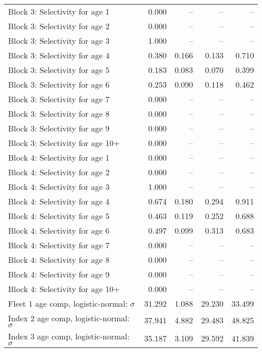 \documentclass[
]{article}
\begin{document}
\begin{landscape}
\begin{longtable}[t]{lrrrr}
Block 3: Selectivity for age 1 & 0.000 & -- & -- & --\\
Block 3: Selectivity for age 2 & 0.000 & -- & -- & --\\
Block 3: Selectivity for age 3 & 1.000 & -- & -- & --\\
Block 3: Selectivity for age 4 & 0.380 & 0.166 & 0.133 & 0.710\\
\addlinespace
Block 3: Selectivity for age 5 & 0.183 & 0.083 & 0.070 & 0.399\\
Block 3: Selectivity for age 6 & 0.253 & 0.090 & 0.118 & 0.462\\
Block 3: Selectivity for age 7 & 0.000 & -- & -- & --\\
Block 3: Selectivity for age 8 & 0.000 & -- & -- & --\\
Block 3: Selectivity for age 9 & 0.000 & -- & -- & --\\
\addlinespace
Block 3: Selectivity for age 10+ & 0.000 & -- & -- & --\\
Block 4: Selectivity for age 1 & 0.000 & -- & -- & --\\
Block 4: Selectivity for age 2 & 0.000 & -- & -- & --\\
Block 4: Selectivity for age 3 & 1.000 & -- & -- & --\\
Block 4: Selectivity for age 4 & 0.674 & 0.180 & 0.294 & 0.911\\
\addlinespace
Block 4: Selectivity for age 5 & 0.463 & 0.119 & 0.252 & 0.688\\
Block 4: Selectivity for age 6 & 0.497 & 0.099 & 0.313 & 0.683\\
Block 4: Selectivity for age 7 & 0.000 & -- & -- & --\\
Block 4: Selectivity for age 8 & 0.000 & -- & -- & --\\
Block 4: Selectivity for age 9 & 0.000 & -- & -- & --\\
\addlinespace
Block 4: Selectivity for age 10+ & 0.000 & -- & -- & --\\
Fleet 1 age comp, logistic-normal: $\sigma$ & 31.292 & 1.088 & 29.230 & 33.499\\
Index 2 age comp, logistic-normal: $\sigma$ & 37.941 & 4.882 & 29.483 & 48.825\\
Index 3 age comp, logistic-normal: $\sigma$ & 35.187 & 3.109 & 29.592 & 41.839\\*
\end{longtable}
\end{landscape}
\end{document}
